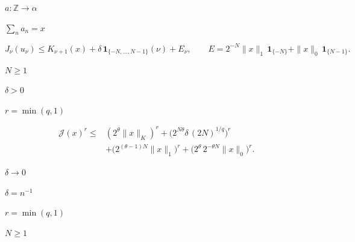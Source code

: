 \documentclass{article}
\begin{document}
\setlength\abovedisplayskip{0pt} %


\begin{preview}
\setcounter{equation}{0}%
\(a \colon \mathbb{Z} \to \alpha\)
\end{preview}

\begin{preview}
\setcounter{equation}{0}%
\(\sum_n a_n = x\)
\end{preview}

\begin{preview}
\setcounter{equation}{0}%
\[J_\nu(u_\nu) \le K_{\nu+1}(x) + \delta\,\mathbf{1}_{\{-N,\dots,N-1\}}(\nu) + E_\nu,
\qquad E = 2^{-N}\|x\|_1\,\mathbf{1}_{\{-N\}} + \|x\|_0\,\mathbf{1}_{\{N-1\}}.\]
\end{preview}

\begin{preview}
\setcounter{equation}{0}%
\(N ≥ 1\)
\end{preview}

\begin{preview}
\setcounter{equation}{0}%
\(δ > 0\)
\end{preview}

\begin{preview}
\setcounter{equation}{0}%
\(r = \min(q, 1)\)
\end{preview}

\begin{preview}
\setcounter{equation}{0}%
\[\begin{aligned}\mathcal{J}(x)^r \le{} & (2^\theta\|x\|_K)^r
  + \bigl(2^{N\theta}\delta\,(2N)^{1/q}\bigr)^r \\
  & + \bigl(2^{(\theta-1)N}\|x\|_1\bigr)^r + \bigl(2^\theta\,2^{-\theta N}\|x\|_0\bigr)^r.
\end{aligned}\]
\end{preview}

\begin{preview}
\setcounter{equation}{0}%
\(δ → 0\)
\end{preview}

\begin{preview}
\setcounter{equation}{0}%
\(δ = n^{-1}\)
\end{preview}

\begin{preview}
\setcounter{equation}{0}%
\(r = \min(q, 1)\)
\end{preview}

\begin{preview}
\setcounter{equation}{0}%
\(N ≥ 1\)
\end{preview}
\end{document}
